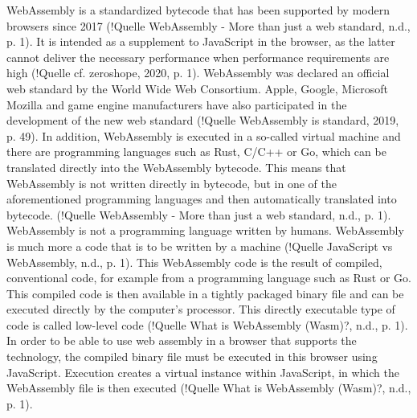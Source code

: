 WebAssembly is a standardized bytecode that has been supported by modern browsers since 2017 (!Quelle WebAssembly - More than just a web standard, n.d., p. 1). It is intended as a supplement to JavaScript in the browser, as the latter cannot deliver the necessary performance when performance requirements are high (!Quelle cf. zeroshope, 2020, p. 1).
WebAssembly was declared an official web standard by the World Wide Web Consortium. Apple, Google, Microsoft Mozilla and game engine manufacturers have also participated in the development of the new web standard (!Quelle WebAssembly is standard, 2019, p. 49).
In addition, WebAssembly is executed in a so-called virtual machine and there are programming languages such as Rust, C/C++ or Go, which can be translated directly into the WebAssembly bytecode. This means that WebAssembly is not written directly in bytecode, but in one of the aforementioned programming languages and then automatically translated into bytecode. (!Quelle WebAssembly - More than just a web standard, n.d., p. 1).
WebAssembly is not a programming language written by humans. WebAssembly is much more a code that is to be written by a machine (!Quelle JavaScript vs WebAssembly, n.d., p. 1). This WebAssembly code is the result of compiled, conventional code, for example from a programming language such as Rust or Go. This compiled code is then available in a tightly packaged binary file and can be executed directly by the computer's processor. This directly executable type of code is called low-level code (!Quelle What is WebAssembly (Wasm)?, n.d., p. 1).
In order to be able to use web assembly in a browser that supports the technology, the compiled binary file must be executed in this browser using JavaScript. Execution creates a virtual instance within JavaScript, in which the WebAssembly file is then executed (!Quelle What is WebAssembly (Wasm)?, n.d., p. 1).